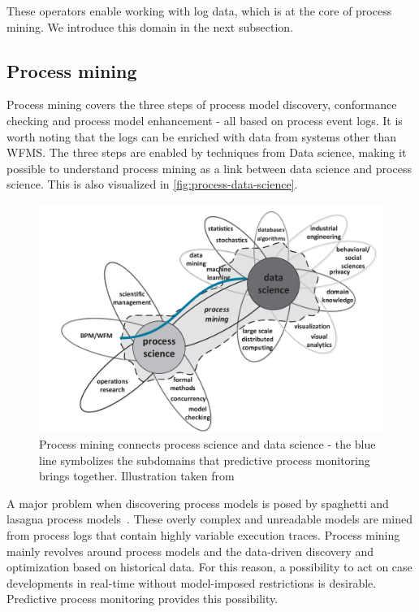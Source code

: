 These operators enable working with log data, which is at the core of process mining.
We introduce this domain in the next subsection.

\subsection{Process mining}\label{sec:process-mining}
Process mining covers the three steps of process model discovery, conformance checking and process model enhancement \cite{Aalst2016} -  all based on process event logs. It is worth noting that the logs can be enriched with data from systems other than WFMS. The three steps are enabled by techniques from Data science, making it possible to understand process mining as a link between data science and process science. This is also visualized in \autoref{fig:process-data-science}.

\begin{figure}[!htb]
    \centering
    \includegraphics[width=.8\textwidth]{gfx/process-data-science.png}
    \caption[Process mining connects two disciplines]{Process mining connects process science and data science - the blue line symbolizes the subdomains that predictive process monitoring brings together. Illustration taken from~\cite[p.18]{Aalst2016}}
    \label{fig:process-data-science}
\end{figure}

A major problem when discovering process models is posed by spaghetti and lasagna process models~\cite{Aalst2016}. These overly complex and unreadable models are mined from process logs that contain highly variable execution traces. Process mining mainly revolves around process models and the data-driven discovery and optimization based on historical data. For this reason, a possibility to act on case developments in real-time without model-imposed restrictions is desirable. Predictive process monitoring provides this possibility.

